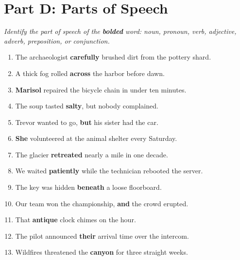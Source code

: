 \documentclass[11pt]{article}
\newcommand{\ansline}{\underline{\hspace{1.1in}}}
\begin{document}
\section*{Part D: Parts of Speech}
\noindent\textit{Identify the part of speech of the \textbf{bolded} word: noun, pronoun, verb, adjective, adverb, preposition, or conjunction.}
\begin{enumerate}
  \item The archaeologist \textbf{carefully} brushed dirt from the pottery shard. \ansline
  \vspace{2pt}
  \item A thick fog rolled \textbf{across} the harbor before dawn. \ansline
  \vspace{2pt}
  \item \textbf{Marisol} repaired the bicycle chain in under ten minutes. \ansline
  \vspace{2pt}
  \item The soup tasted \textbf{salty}, but nobody complained. \ansline
  \vspace{2pt}
  \item Trevor wanted to go, \textbf{but} his sister had the car. \ansline
  \vspace{2pt}
  \item \textbf{She} volunteered at the animal shelter every Saturday. \ansline
  \vspace{2pt}
  \item The glacier \textbf{retreated} nearly a mile in one decade. \ansline
  \vspace{2pt}
  \item We waited \textbf{patiently} while the technician rebooted the server. \ansline
  \vspace{2pt}
  \item The key was hidden \textbf{beneath} a loose floorboard. \ansline
  \vspace{2pt}
  \item Our team won the championship, \textbf{and} the crowd erupted. \ansline
  \vspace{2pt}
  \item That \textbf{antique} clock chimes on the hour. \ansline
  \vspace{2pt}
  \item The pilot announced \textbf{their} arrival time over the intercom. \ansline
  \vspace{2pt}
  \item Wildfires threatened the \textbf{canyon} for three straight weeks. \ansline

\end{enumerate}
\end{document}

